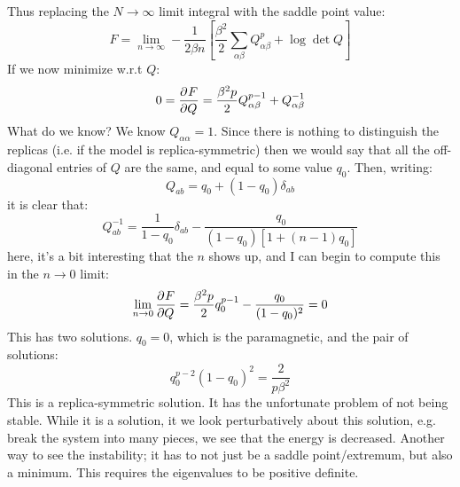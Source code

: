 Thus replacing the $N \to \infty$ limit integral with the saddle point value:
\begin{equation}
    F = \lim_{n \to \infty} -\frac{1}{2\beta n}\left[\frac{\beta^2}{2}\sum_{\alpha\beta}Q^p_{\alpha\beta} + \log \det Q\right]
\end{equation}
If we now minimize w.r.t $Q$:
\begin{equation}
    0 = \dpd{F}{Q} = \frac{\beta^2 p}{2}Q_{\alpha\beta}^{p-1} + Q^{-1}_{\alpha\beta}
\end{equation}
What do we know? We know $Q_{\alpha\alpha} = 1$. Since there is nothing to distinguish the replicas (i.e. if the model is replica-symmetric) then we would say that all the off-diagonal entries of $Q$ are the same, and equal to some value $q_0$. Then, writing:
\begin{equation}
    Q_{ab} = q_0 + (1 - q_0)\delta_{ab}
\end{equation}
it is clear that:
\begin{equation}
    Q_{ab}^{-1} = \frac{1}{1-q_0}\delta_{ab} - \frac{q_0}{(1-q_0)[1 + (n-1)q_0]}
\end{equation}
here, it's a bit interesting that the $n$ shows up, and I can begin to compute this in the $n \to 0$ limit:
\begin{equation}
    \lim_{n \to 0} \dpd{F}{Q} = \frac{\beta^2 p}{2}q_0^{p-1} - \frac{q_0}{(1-q_0)^2} = 0
\end{equation}
This has two solutions. $q_0 = 0$, which is the paramagnetic, and the pair of solutions:
\begin{equation}
    q_0^{p-2}(1-q_0)^2 = \frac{2}{p\beta^2}
\end{equation}
This is a replica-symmetric solution. It has the unfortunate problem of not being stable. While it is a solution, it we look perturbatively about this solution, e.g. break the system into many pieces, we see that the energy is decreased. Another way to see the instability; it has to not just be a saddle point/extremum, but also a minimum. This requires the eigenvalues to be positive definite.

